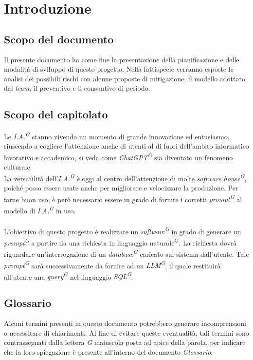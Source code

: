 \documentclass[5pt]{article}
\begin{document}
\pagebreak

\section{Introduzione}
  \subsection{Scopo del documento}
    Il presente documento ha come fine la presentazione della pianificazione e delle modalità di sviluppo di questo progetto. 
    Nella fattispecie verranno esposte le analisi dei possibili rischi con alcune proposte di mitigazione, il modello adottato dal \textit{team}, 
    il preventivo e il consuntivo di periodo.

  \subsection{Scopo del capitolato}
    Le \textit{I.A.\textsuperscript{G}} stanno vivendo un momento di grande innovazione ed entusiasmo, 
    riuscendo a cogliere l'attenzione anche di utenti al di fuori dell'ambito informatico lavorativo e accademico, 
    si veda come \textit{ChatGPT\textsuperscript{G}} sia diventato un fenomeno culturale. \\
    La versatilità dell'\textit{I.A.\textsuperscript{G}} è oggi al centro dell'attenzione di molte \textit{software house\textsuperscript{G}}, 
    poiché posso essere usate anche per migliorare e velocizzare la produzione. 
    Per farne buon uso, è però necessario essere in grado di fornire i corretti \textit{prompt\textsuperscript{G}} al 
    modello di \textit{I.A.\textsuperscript{G}} in uso. \\\\
    L'obiettivo di questo progetto è realizzare un \textit{software\textsuperscript{G}} in grado di generare 
    un \textit{prompt\textsuperscript{G}} a partire da una richiesta in linguaggio naturale\textsuperscript{G}. La richiesta dovrà riguardare un'interrogazione 
    di un \textit{database\textsuperscript{G}} caricato sul sistema dall'utente. Tale \textit{prompt\textsuperscript{G}} sarà successivamente da fornire 
    ad un \textit{LLM\textsuperscript{G}}, il quale restituirà all'utente una \textit{query\textsuperscript{G}} nel linguaggio 
    \textit{SQL\textsuperscript{G}}.

  \subsection{Glossario}
    Alcuni termini presenti in questo documento potrebbero generare incomprensioni o necessitare di chiarimenti. 
    Al fine di evitare queste eventualità, tali termini sono contrassegnati dalla lettera \textit{G} maiuscola posta ad apice della parola, 
    per indicare che la loro spiegazione è presente all'interno del documento \textit{Glossario}.
\end{document}
